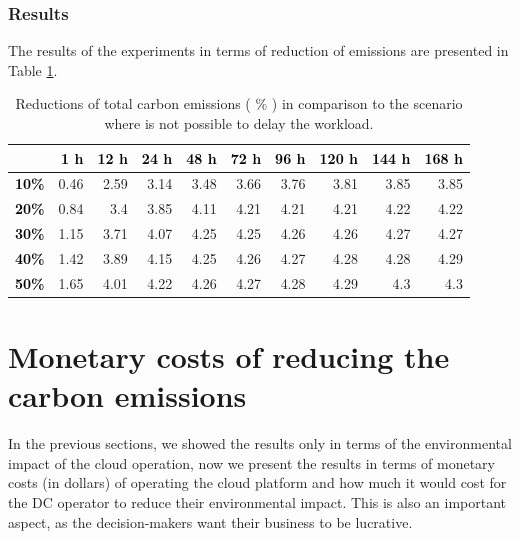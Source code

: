 \subsubsection{Results}

The results of the experiments in terms of reduction of  emissions are presented in Table \ref{tab:flex_scheduling}.



\begin{table}[h]
\caption{Reductions of total carbon emissions ( \% ) in comparison to the scenario where is not possible to delay the workload.}\centering
\label{tab:flex_scheduling}
\begin{tabular}{|l|r|r|r|r|r|r|r|r|r|}
\hline
\backslashbox{$\alpha$}{$\beta$} &   \textcolor{black}{\textbf{ 1 h }} &  \textcolor{black}{\textbf{ 12 h }} &  \textcolor{black}{\textbf{ 24 h }} &  \textcolor{black}{\textbf{ 48 h }}  &   \textcolor{black}{\textbf{ 72 h}} &   \textcolor{black}{\textbf{ 96 h}} &   \textcolor{black}{\textbf{ 120 h }} &   \textcolor{black}{\textbf{ 144 h}} &   \textcolor{black}{\textbf{ 168 h}} \\ 
     \hline
 \textcolor{black}{ \textbf{10\%}}   &  0.46 &  2.59 &  3.14 &  3.48 &  3.66 &  3.76 &  3.81 &  3.85 &  3.85 \\ 
\hline
 \textcolor{black}{ \textbf{20\%}}   &  0.84 &  3.4 &  3.85 &  4.11 &  4.21 &  4.21 &  4.21 &  4.22 &  4.22 \\ 
\hline
 \textcolor{black}{ \textbf{30\%}}   &  1.15 &  3.71 &  4.07 &  4.25 &  4.25 &  4.26 &  4.26 &  4.27 &  4.27 \\ 
\hline
 \textcolor{black}{ \textbf{40\%}}   &  1.42 &  3.89 &  4.15 &  4.25 &  4.26 &  4.27 &  4.28 &  4.28 &  4.29 \\ 
\hline
 \textcolor{black}{ \textbf{50\%}}   &  1.65 &  4.01 &  4.22 &  4.26 &  4.27 &  4.28 &  4.29 &  4.3 &  4.3 \\ 
\hline
\end{tabular}
\end{table}


\section{ Monetary costs of reducing the carbon emissions}
\label{sec:costs}
In the previous sections, we showed the results only in terms of the environmental impact of the cloud operation, now we present the results in terms of monetary costs (in dollars) of operating the cloud platform and how much it would cost for the DC operator to reduce their environmental impact. This is also an important aspect, as the decision-makers want their business to be lucrative.

